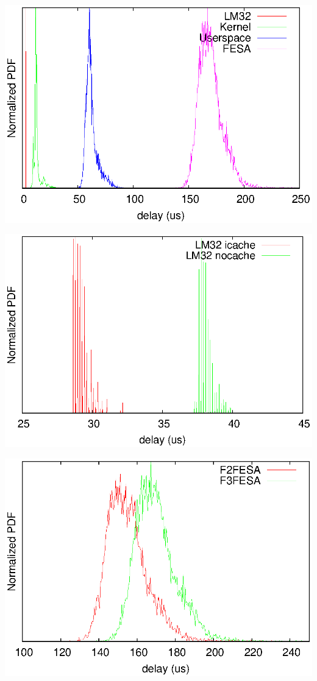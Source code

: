 \documentclass[25pt,halfparskip-,pagesize]{scrartcl}
\begin{document}
\begin{multicols*}{3}
\includegraphics[width=\columnwidth]{../images/WEPD48f1}

\includegraphics[width=\columnwidth]{../images/lm32plot}

\includegraphics[width=\columnwidth]{../images/fesa_plot}


\end{multicols*}
\end{document}
